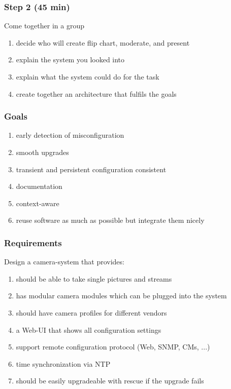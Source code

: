 \begin{frame}
	\frametitle{Step 2 (45 min)}

	Come together in a group

	\begin{enumerate}
	\item decide who will create flip chart, moderate, and present
	\item explain the system you looked into
	\item explain what the system could do for the task
	\item create together an architecture that fulfils the goals
	\end{enumerate}
\end{frame}

\begin{frame}
	\frametitle{Goals}

	\begin{enumerate}
	\item early detection of misconfiguration
	\item smooth upgrades
	\item transient and persistent configuration consistent
	\item documentation
	\item context-aware
	\item reuse software as much as possible but integrate them nicely
	\end{enumerate}
\end{frame}

\begin{frame}
	\frametitle{Requirements}

	Design a camera-system that provides:

	\begin{enumerate}
	\item should be able to take single pictures and streams
	\item has modular camera modules which can be plugged into the system
	\item should have camera profiles for different vendors
	\item a Web-UI that shows all configuration settings
	\item support remote configuration protocol (Web, SNMP, CMs, ...)
	\item time synchronization via NTP
	\item should be easily upgradeable with rescue if the upgrade fails
	\end{enumerate}
\end{frame}

